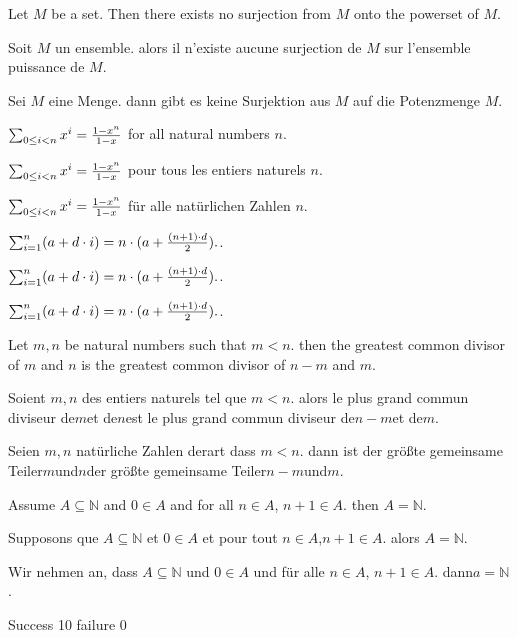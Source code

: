 \documentclass{article}
\begin{document}
Let $M$ be a set. Then there exists no surjection from $M$ onto the powerset of $M$.

Soit $M$ un ensemble. alors il n'existe aucune surjection de $M$ sur l'ensemble puissance de $M $.

Sei $M$ eine Menge. dann gibt es keine Surjektion aus $M$ auf die Potenzmenge $M $.


 $\sumgeom{x}{n} = \frac{1 - x^{n}}{1 - x}$ for all natural numbers $n$.

 $\sumgeom{x}{n} = \frac{1 - x^{n}}{1 - x}$ pour tous les entiers naturels $n $.

 $\sumgeom{x}{n} = \frac{1 - x^{n}}{1 - x}$ für alle natürlichen Zahlen $n $.


 $\sumarith{a}{d}{n} = n \cdot (a + \frac{(n + 1) \cdot d}{2}).$.

 $\sumarith{a}{d}{n} = n \cdot (a + \frac{(n + 1) \cdot d}{2}). $.

 $\sumarith{a}{d}{n} = n \cdot (a + \frac{(n + 1) \cdot d}{2}). $.


Let $m , n$ be natural numbers such that $m < n$. then the greatest common divisor of $m$ and $n$ is the greatest common divisor of $n-m$ and $m$.

Soient $m , n$ des entiers naturels tel que $m < n $. alors le plus grand commun diviseur de$ m $et de$ n $est le plus grand commun diviseur de$ n-m $et de$ m $.

Seien $m , n$ natürliche Zahlen derart dass $m < n $. dann ist der größte gemeinsame Teiler$ m $und$ n $der größte gemeinsame Teiler$ n-m $und$ m $.


Assume $A \subseteq \mathbb{N}$ and $0 \in A$ and for all $n \in A$, $n + 1 \in A$. then $A = \mathbb{N}$.

Supposons que $A \subseteq \mathbb{N}$ et $0 \in A$ et pour tout $n \in A $,$ n + 1 \in A $. alors $A = \mathbb{N} $.

Wir nehmen an, dass $A \subseteq \mathbb{N}$ und $0 \in A$ und für alle $n \in A$, $n + 1 \in A $. dann$ a = \mathbb{N} $.


Success 10 failure 0
\end{document}
